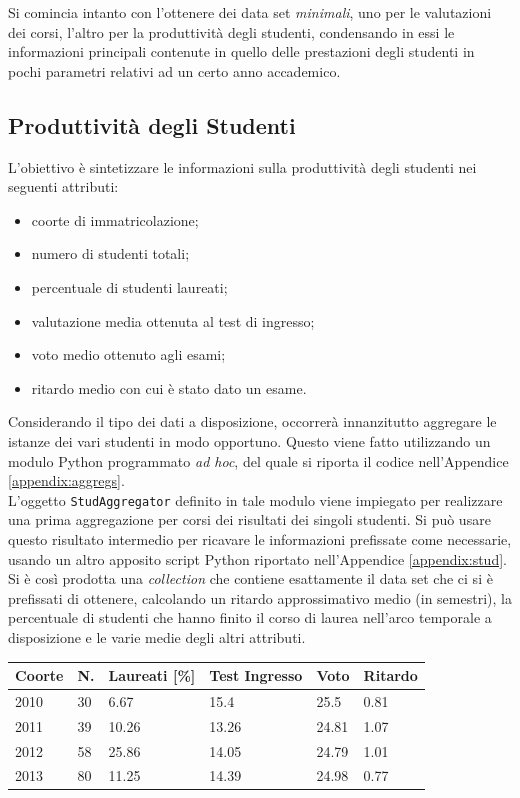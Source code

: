 	Si comincia intanto con l'ottenere dei data set \textit{minimali}, uno per le valutazioni dei corsi, l'altro per la produttività degli studenti, condensando in essi le informazioni principali contenute in quello delle prestazioni degli studenti in pochi parametri relativi ad un certo anno accademico. \\

	\subsection{Produttività degli Studenti}

		L'obiettivo è sintetizzare le informazioni sulla produttività degli studenti nei seguenti attributi:

		\begin{itemize}
			\item coorte di immatricolazione;
			\item numero di studenti totali;
			\item percentuale di studenti laureati;
			\item valutazione media ottenuta al test di ingresso;
			\item voto medio ottenuto agli esami;
			\item ritardo medio con cui è stato dato un esame.
		\end{itemize}

		Considerando il tipo dei dati a disposizione, occorrerà innanzitutto aggregare le istanze dei vari studenti in modo opportuno. Questo viene fatto utilizzando un modulo Python programmato \textit{ad hoc}, del quale si riporta il codice nell'Appendice \ref{appendix:aggregs}. \\
		
		L'oggetto \texttt{StudAggregator} definito in tale modulo viene impiegato per realizzare una prima aggregazione per corsi dei risultati dei singoli studenti. Si può usare questo risultato intermedio per ricavare le informazioni prefissate come necessarie, usando un altro apposito script Python riportato nell'Appendice \ref{appendix:stud}. Si è così prodotta una \textit{collection} che contiene esattamente il data set che ci si è prefissati di ottenere, calcolando un ritardo approssimativo medio (in semestri), la percentuale di studenti che hanno finito il corso di laurea nell'arco temporale a disposizione e le varie medie degli altri attributi.\\

		\begin{tabular}{llllll}
		\hline
		Coorte & N. & Laureati {[}\%{]} & Test Ingresso & Voto & Ritardo \\ \hline
		2010 & 30 & 6.67 & 15.4 & 25.5 & 0.81 \\
		2011 & 39 & 10.26 & 13.26 & 24.81 & 1.07 \\
		2012 & 58 & 25.86 & 14.05 & 24.79 & 1.01 \\
		2013 & 80 & 11.25 & 14.39 & 24.98 & 0.77 \\ \hline
		\end{tabular}

